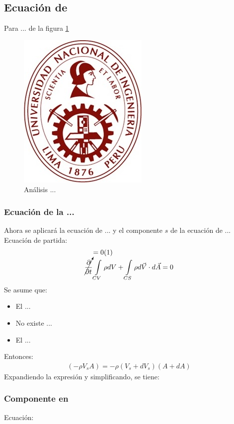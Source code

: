\subsection{Ecuación de }
\begin{adjustwidth}{2.4em}{0em}
	Para ...  de la figura \ref{fig:fig1}
	\begin{figure}[H]
		\singlespacing
		\centering
		\includegraphics[width=0.2\linewidth]{logo}
		\caption[Análisis ...]{Análisis ...}
		\label{fig:fig1}
	\end{figure}
	\subsubsection{Ecuación de la ...}
	Ahora se aplicará la ecuación de ... y el componente $s$ de la ecuación de ...\\
	Ecuación de partida: 
	\begin{equation*}
	\cancelto{=0(1)}{\frac{\partial}{\partial t}} \int\limits_{CV} \rho dV + \int\limits_{CS} \rho d\vec{V} \cdot d\vec{A} = 0
	\end{equation*}
	Se asume que:
	\begin{itemize}[noitemsep]
		\item El ...
		\item No existe ...
		\item El ...
	\end{itemize}
	Entonces:
	\begin{align}
	(-\rho V_s A) = -\rho(V_s+d V_s)(A+dA) \nonumber 
	\end{align}
	Expandiendo la expresión y simplificando, se tiene:
	
	\subsubsection{Componente en}
	Ecuación:

\end{adjustwidth}

